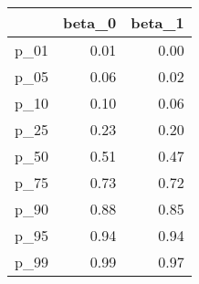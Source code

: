 \begin{table}[ht]
\centering
\begin{tabular}{rrr}
  \hline
 & beta\_0 & beta\_1 \\ 
  \hline
p\_01 & 0.01 & 0.00 \\ 
  p\_05 & 0.06 & 0.02 \\ 
  p\_10 & 0.10 & 0.06 \\ 
  p\_25 & 0.23 & 0.20 \\ 
  p\_50 & 0.51 & 0.47 \\ 
  p\_75 & 0.73 & 0.72 \\ 
  p\_90 & 0.88 & 0.85 \\ 
  p\_95 & 0.94 & 0.94 \\ 
  p\_99 & 0.99 & 0.97 \\ 
   \hline
\end{tabular}
\end{table}
